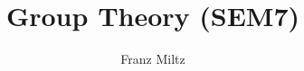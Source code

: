 \documentclass{article}
\begin{document}
\mkthmstwounified
\title{Group Theory (SEM7)}
\author{Franz Miltz}
\maketitle
\tableofcontents
\pagebreak
\end{document}
